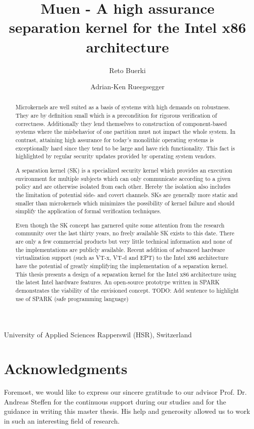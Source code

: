 \documentclass[a4paper,twoside]{report}
\title{Muen - A high assurance separation kernel for the Intel x86 architecture}
\author{Reto Buerki \and Adrian-Ken Rueegsegger}
\begin{document}


\maketitle

University of Applied Sciences Rapperswil (HSR), Switzerland

\begin{abstract}
Microkernels are well suited as a basis of systems with high demands on
robustness. They are by definition small which is a precondition for rigorous
verification of correctness. Additionally they lend themselves to construction
of component-based systems where the misbehavior of one partition must not
impact the whole system. In contrast, attaining high assurance for today's
monolithic operating systems is exceptionally hard since they tend to be large
and have rich functionality. This fact is highlighted by regular security
updates provided by operating system vendors.

A separation kernel (SK) is a specialized security kernel which provides an
execution environment for multiple subjects which can only communicate according
to a given policy and are otherwise isolated from each other. Hereby the
isolation also includes the limitation of potential side- and covert channels.
SKs are generally more static and smaller than microkernels which minimizes the
possibility of kernel failure and should simplify the application of formal
verification techniques.

Even though the SK concept has garnered quite some attention from the research
community over the last thirty years, no freely available SK exists to this
date.  There are only a few commercial products but very little technical
information and none of the implementations are publicly available. Recent
addition of advanced hardware virtualization support (such as VT-x, VT-d and
EPT) to the Intel x86 architecture have the potential of greatly simplifying the
implementation of a separation kernel. This thesis presents a design of a
separation kernel for the Intel x86 architecture using the latest Intel hardware
features. An open-source prototype written in SPARK demonstrates the viability of the
envisioned concept. TODO: Add sentence to highlight use of SPARK (safe
programming language)
\end{abstract}

\section*{Acknowledgments}
Foremost, we would like to express our sincere gratitude to our advisor Prof.
Dr. Andreas Steffen for the continuous support during our studies and for the
guidance in writing this master thesis. His help and generosity allowed us to
work in such an interesting field of research.
\end{document}
